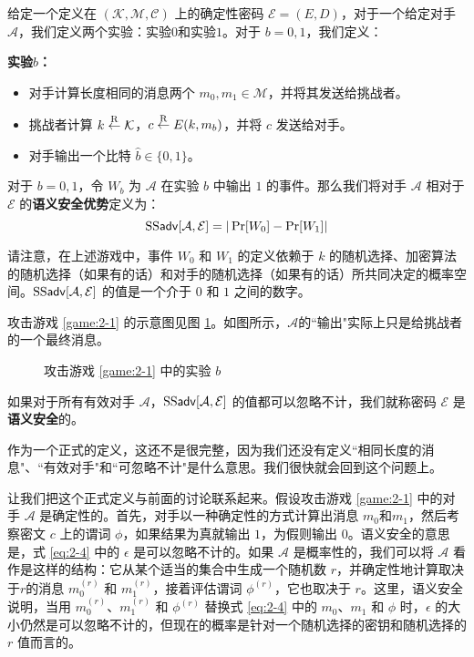 \begin{game}[语义安全性]\label{game:2-1}
给定一个定义在 $(\mathcal{K},\mathcal{M},\mathcal{C})$ 上的确定性密码 $\mathcal{E}=(E,D)$，对于一个给定对手 $\mathcal{A}$，我们定义两个实验：实验$0$和实验$1$。对于 $b=0,1$，我们定义：

\noindent\textbf{实验$b$：}
\begin{itemize}
	\item 对手计算长度相同的消息两个 $m_0,m_1\in\mathcal{M}$，并将其发送给挑战者。
	\item 挑战者计算 $k\overset{\rm R}\leftarrow\mathcal{K}$，$c\overset{\rm R}\leftarrow E(k,m_b)$，并将 $c$ 发送给对手。
	\item 对手输出一个比特 $\hat b\in\{0,1\}$。
\end{itemize}

对于 $b=0,1$，令 $W_b$ 为 $\mathcal{A}$ 在实验 $b$ 中输出 $1$ 的事件。那么我们将对手 $\mathcal{A}$ 相对于 $\mathcal{E}$ 的\textbf{语义安全优势}定义为：
$$
{\rm SS\mathsf{adv}}[\mathcal{A},\mathcal{E}]=|\Pr[W_0] -\Pr[W_1]|
$$
\end{game}

请注意，在上述游戏中，事件 $W_0$ 和 $W_1$ 的定义依赖于 $k$ 的随机选择、加密算法的随机选择（如果有的话）和对手的随机选择（如果有的话）所共同决定的概率空间。${\rm SS\mathsf{adv}}[\mathcal{A},\mathcal{E}]$ 的值是一个介于 $0$ 和 $1$ 之间的数字。

攻击游戏 \ref{game:2-1} 的示意图见图 \ref{fig:2-1}。如图所示，$\mathcal{A}$的``输出"实际上只是给挑战者的一个最终消息。

\begin{figure}
	\centering
	
	\caption{攻击游戏 \ref{game:2-1} 中的实验 $b$}
	\label{fig:2-1}
\end{figure}

\begin{definition}[语义安全性]\label{def:2-2}
如果对于所有有效对手 $\mathcal{A}$，${\rm SS\mathsf{adv}}[\mathcal{A},\mathcal{E}]$ 的值都可以忽略不计，我们就称密码 $\mathcal{E}$ 是\textbf{语义安全}的。
\end{definition}

作为一个正式的定义，这还不是很完整，因为我们还没有定义``相同长度的消息"、``有效对手"和``可忽略不计"是什么意思。我们很快就会回到这个问题上。

让我们把这个正式定义与前面的讨论联系起来。假设攻击游戏 \ref{game:2-1} 中的对手 $\mathcal{A}$ 是确定性的。首先，对手以一种确定性的方式计算出消息 $m_0$和$m_1$，然后考察密文 $c$ 上的谓词 $\phi$，如果结果为真就输出 $1$，为假则输出 $0$。语义安全的意思是，式 \ref{eq:2-4} 中的 $\epsilon$ 是可以忽略不计的。如果 $\mathcal{A}$ 是概率性的，我们可以将 $\mathcal{A}$ 看作是这样的结构：它从某个适当的集合中生成一个随机数 $r$，并确定性地计算取决于$r$的消息 $m^{(r)}_0$ 和 $m^{(r)}_1$，接着评估谓词 $\phi^{(r)}$，它也取决于 $r$。这里，语义安全说明，当用 $m^{(r)}_0$、$m^{(r)}_1$ 和 $\phi^{(r)}$ 替换式 \ref{eq:2-4} 中的 $m_0$、$m_1$ 和 $\phi$ 时，$\epsilon$ 的大小仍然是可以忽略不计的，但现在的概率是针对一个随机选择的密钥和随机选择的 $r$ 值而言的。

